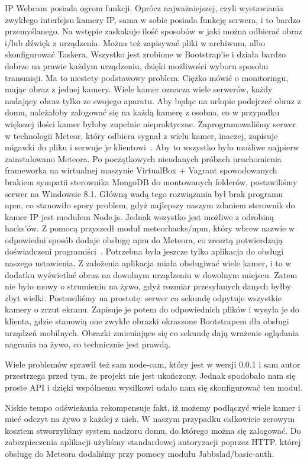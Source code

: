 \documentclass[brudnopis]{xmgr}
\begin{document}
IP Webcam posiada ogrom funkcji. Oprócz najważniejszej, czyli wystawiania zwykłego interfejsu kamery IP, sama w sobie posiada funkcję serwera, i to bardzo przemyślanego. Na wstępie zaskakuje ilość sposobów w jaki można odbierać obraz i/lub dźwięk z urządzenia. Można też zapisywać pliki w archiwum, albo skonfigurować Taskera. Wszystko jest zrobione w Bootstrap'ie i działa bardzo dobrze na prawie każdym urządzeniu, dzięki możliwości wyboru sposobu transmisji.
Ma to niestety podstawowy problem. Ciężko mówić o monitoringu, mając obraz z jednej kamery. Wiele kamer oznacza wiele serwerów, każdy nadający obraz tylko ze swojego aparatu. Aby będąc na urlopie podejrzeć obraz z domu, należałoby zalogować się na każdą kamerę z osobna, co w przypadku większej ilości kamer byłoby zupełnie niepraktyczne. Zaprogramowaliśmy serwer w technologii Meteor, który odbiera sygnał z wielu kamer, inaczej, zapisuje migawki do pliku i serwuje je klientowi~\cite{Started}.
Aby to wszystko było możliwe najpierw zainstalowano Meteora. Po początkowych nieudanych próbach uruchomienia frameworka na wirtualnej maszynie VirtualBox + Vagrant spowodowanych brakiem sympatii sterownika MongoDB do montowanych folderów, postawiliśmy serwer na Windowsie 8.1. Główną wadą tego rozwiązania był brak programu npm, co stanowiło spory problem, gdyż najlepszy naszym zdaniem sterownik do kamer IP jest modułem Node.js. Jednak wszystko jest możliwe z odrobiną hacks'ów. Z pomocą przyszedł moduł meteorhacks/npm, który wbrew nazwie w odpowiedni sposób dodaje obsługę npm do Meteora, co zresztą potwierdzają doświadczeni programiści~\cite{Npm:2014:CMC}.
Potrzebna była jeszcze tylko aplikacja do obsługi naszego ustawienia. Z założenia aplikacja miała obsługiwać wiele kamer, i to w dodatku wyświetlać obraz na dowolnym urządzeniu w dowolnym miejscu. Zatem nie było mowy o strumieniu na żywo, gdyż rozmiar przesyłanych danych byłby zbyt wielki. Postawiliśmy na prostotę: serwer co sekundę odpytuje wszystkie kamery o zrzut ekranu. Zapisuje je potem do odpowiednich plików i wysyła je do klienta, gdzie stanowią one zwykłe obrazki okraszone Bootstrapem dla obsługi urządzeń mobilnych. Obrazki zmieniające się co sekundę dają wrażenie oglądania nagrania na żywo, co technicznie jest prawdą.

Wiele problemów sprawił też sam node-cam, który jest w wersji 0.0.1 i sam autor przestrzega przed tym, że projekt nie jest ukończony. Jednak spodobało nam się proste API i dzięki wspólnemu wysiłkowi udało nam się skonfigurować ten moduł.

Niskie tempo odświeżania rekompensuje fakt, iż możemy podłączyć wiele kamer i mieć odczyt na żywo z każdej z nich. W naszym przypadku całkowicie zerowym kosztem stworzyliśmy system nadzoru domu, do którego można się zalogować. Do zabezpieczenia aplikacji użyliśmy standardowej autoryzacji poprzez HTTP, której obsługę do Meteora dodaliśmy przy pomocy modułu Jabbslad/basic-auth.
\end{document}
